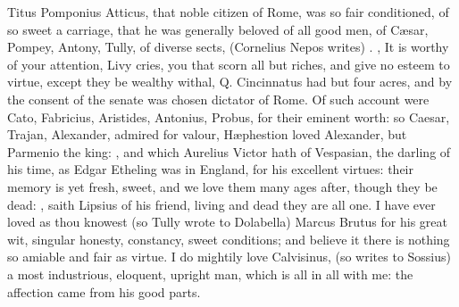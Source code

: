 {Titus Pomponius Atticus, that noble citizen of Rome, was so fair
conditioned, of so sweet a carriage, that he was generally beloved of
all good men, of C\ae{}sar, Pompey, Antony, Tully, of diverse sects, \etc{}
 (Cornelius Nepos writes) . , \etc{} It is worthy of your
attention, Livy cries, you that scorn all but riches, and give no
esteem to virtue, except they be wealthy withal, Q. Cincinnatus had but
four acres, and by the consent of the senate was chosen dictator of
Rome. Of such account were Cato, Fabricius, Aristides, Antonius,
Probus, for their eminent worth: so Caesar, Trajan, Alexander, admired
for valour,  H\ae{}phestion loved Alexander, but Parmenio the king:
, and which Aurelius Victor hath of
Vespasian, the darling of his time, as Edgar Etheling was in
England, for his excellent virtues: their memory is yet fresh,
sweet, and we love them many ages after, though they be dead: , saith Lipsius of his friend, living and dead
they are all one. I have ever loved as thou knowest (so Tully
wrote to Dolabella) Marcus Brutus for his great wit, singular honesty,
constancy, sweet conditions; and believe it  there is nothing so
amiable and fair as virtue. I do mightily love Calvisinus, (so
\Pliny{} writes to Sossius) a most industrious, eloquent, upright man,
which is all in all with me: the affection came from his good parts.

}
